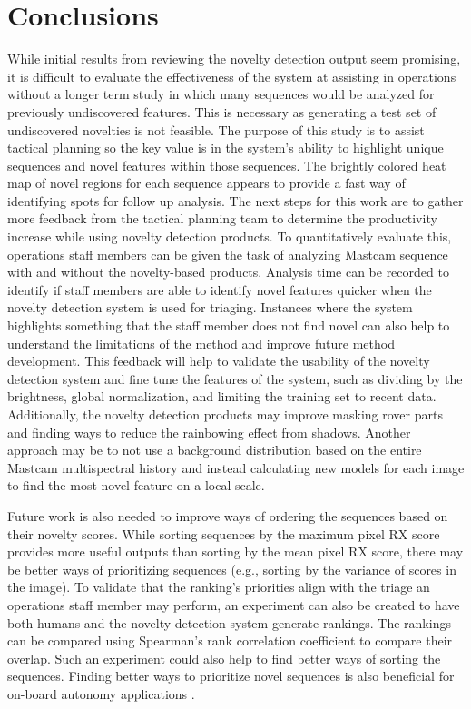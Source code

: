 \section{Conclusions}
While initial results from reviewing the novelty detection output seem promising, it is difficult to evaluate the effectiveness of the system at assisting in operations without a longer term study in which many sequences would be analyzed for previously undiscovered features.
This is necessary as generating a test set of undiscovered novelties is not feasible.
The purpose of this study is to assist tactical planning so the key value is in the system's ability to highlight unique sequences and novel features within those sequences. 
The brightly colored heat map of novel regions for each sequence appears to provide a fast way of identifying spots for follow up analysis. 
The next steps for this work are to gather more feedback from the tactical planning team to determine the productivity increase while using novelty detection products.
To quantitatively evaluate this, operations staff members can be given the task of analyzing Mastcam sequence with and without the novelty-based products.
Analysis time can be recorded to identify if staff members are able to identify novel features quicker when the novelty detection system is used for triaging.
Instances where the system highlights something that the staff member does not find novel can also help to understand the limitations of the method and improve future method development.
This feedback will help to validate the usability of the novelty detection system and fine tune the features of the system, such as dividing by the brightness, global normalization, and limiting the training set to recent data. 
Additionally, the novelty detection products may improve masking rover parts and finding ways to reduce the rainbowing effect from shadows.
Another approach may be to not use a background distribution based on the entire Mastcam multispectral history and instead calculating new models for each image to find the most novel feature on a local scale.

Future work is also needed to improve ways of ordering the sequences based on their novelty scores.
While sorting sequences by the maximum pixel RX score provides more useful outputs than sorting by the mean pixel RX score, there may be better ways of prioritizing sequences (e.g., sorting by the variance of scores in the image). %
To validate that the ranking's priorities align with the triage an operations staff member may perform, an experiment can also be created to have both humans and the novelty detection system generate rankings.
The rankings can be compared using Spearman's rank correlation coefficient to compare their overlap.
Such an experiment could also help to find better ways of sorting the sequences.
Finding better ways to prioritize novel sequences is also beneficial for on-board autonomy applications \cite{wagstaffnovelty}.

